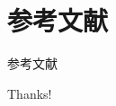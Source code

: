 \documentclass[]{beamer}
\begin{document}


\section{参考文献}

\begin{frame}{参考文献}
    \nocite{*}
    
    
\end{frame}

\begin{frame}
    \begin{center}
        {\Huge\calligra Thanks!}
    \end{center}
\end{frame}
\end{document}
